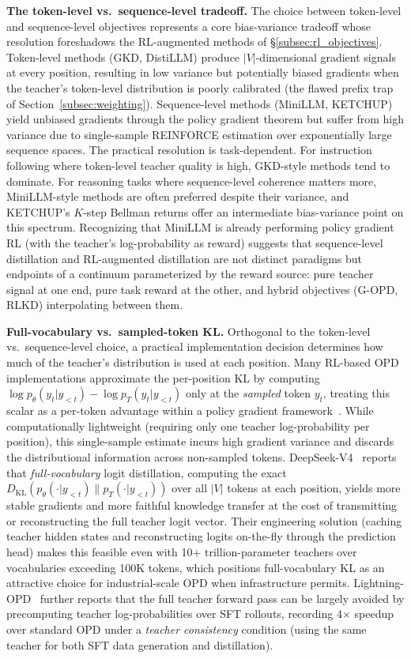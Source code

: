 \documentclass{article} %
\newcommand{\KL}{D_{\mathrm{KL}}}
\newcommand{\ptheta}{p_\theta}
\newcommand{\pteacher}{p_T}
\begin{document}
\textbf{The token-level vs.\ sequence-level tradeoff.} The choice between token-level and sequence-level objectives represents a core bias-variance tradeoff whose resolution foreshadows the RL-augmented methods of \S\ref{subsec:rl_objectives}. Token-level methods (GKD, DistiLLM) produce $|V|$-dimensional gradient signals at every position, resulting in low variance but potentially biased gradients when the teacher's token-level distribution is poorly calibrated (the flawed prefix trap of Section~\ref{subsec:weighting}). Sequence-level methods (MiniLLM, KETCHUP) yield unbiased gradients through the policy gradient theorem but suffer from high variance due to single-sample REINFORCE estimation over exponentially large sequence spaces. The practical resolution is task-dependent. For instruction following where token-level teacher quality is high, GKD-style methods tend to dominate. For reasoning tasks where sequence-level coherence matters more, MiniLLM-style methods are often preferred despite their variance, and KETCHUP's $K$-step Bellman returns offer an intermediate bias-variance point on this spectrum. Recognizing that MiniLLM is already performing policy gradient RL (with the teacher's log-probability as reward) suggests that sequence-level distillation and RL-augmented distillation are not distinct paradigms but endpoints of a continuum parameterized by the reward source: pure teacher signal at one end, pure task reward at the other, and hybrid objectives (G-OPD, RLKD) interpolating between them.

\textbf{Full-vocabulary vs.\ sampled-token KL.} Orthogonal to the token-level vs.\ sequence-level choice, a practical implementation decision determines how much of the teacher's distribution is used at each position. Many RL-based OPD implementations approximate the per-position KL by computing $\log \ptheta(y_t|y_{<t}) - \log \pteacher(y_t|y_{<t})$ only at the \emph{sampled} token $y_t$, treating this scalar as a per-token advantage within a policy gradient framework~\citep{lu2025onpolicy}. While computationally lightweight (requiring only one teacher log-probability per position), this single-sample estimate incurs high gradient variance and discards the distributional information across non-sampled tokens. DeepSeek-V4~\citep{deepseekv4} reports that \emph{full-vocabulary} logit distillation, computing the exact $\KL(\ptheta(\cdot|y_{<t}) \parallel \pteacher(\cdot|y_{<t}))$ over all $|V|$ tokens at each position, yields more stable gradients and more faithful knowledge transfer at the cost of transmitting or reconstructing the full teacher logit vector. Their engineering solution (caching teacher hidden states and reconstructing logits on-the-fly through the prediction head) makes this feasible even with 10+ trillion-parameter teachers over vocabularies exceeding 100K tokens, which positions full-vocabulary KL as an attractive choice for industrial-scale OPD when infrastructure permits. Lightning-OPD~\citep{wu2026lightning} further reports that the full teacher forward pass can be largely avoided by precomputing teacher log-probabilities over SFT rollouts, recording 4$\times$ speedup over standard OPD under a \emph{teacher consistency} condition (using the same teacher for both SFT data generation and distillation).
\end{document}
